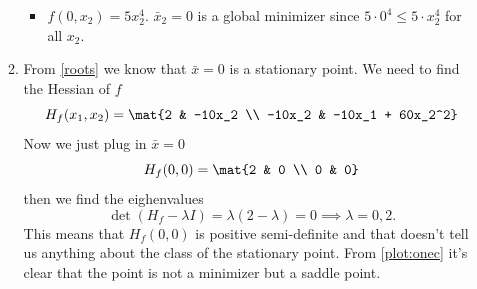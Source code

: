 \documentclass{article}
\begin{document}
\begin{tasks}
\begin{enumerate}[label={\color{tcum}P \Roman{week}.\arabic*}]
\begin{enumerate}
\begin{itemize}
                            \item \(f(0, x_2) = 5x_2^4\). \(\bar{x}_2 = 0\) is a global minimizer
                                since \(5\cdot0^4 \le 5\cdot x_2^4\) for all \(x_2\).
                        \end{itemize}
                    \item From \ref{roots} we know that \(\bar{x} = 0\) is a stationary 
                        point. We need to find the Hessian of \(f\)
                        \begin{displaymath}
                            H_f(x_1, x_2) = \mat{2 & -10x_2 \\ -10x_2 & -10x_1 + 60x_2^2}
                        \end{displaymath}
                        Now we just plug in \(\bar{x} = 0\)
                        \begin{displaymath}
                            H_f(0, 0) = \mat{2 & 0 \\ 0 & 0}
                        \end{displaymath}
                        then we find the eighenvalues
                        \begin{displaymath}
                            \det(H_f - \lambda I)
                            = \lambda(2-\lambda) 
                            = 0 \implies \lambda 
                            = 0, 2.
                        \end{displaymath}
                        This means that \(H_f(0,0)\) is positive semi-definite and that doesn't tell us anything about the class of the stationary point. From \cref{plot:onec} it's clear that the point is not a minimizer but a saddle point.


\end{enumerate}
\end{enumerate}
\end{tasks}
\end{document}
